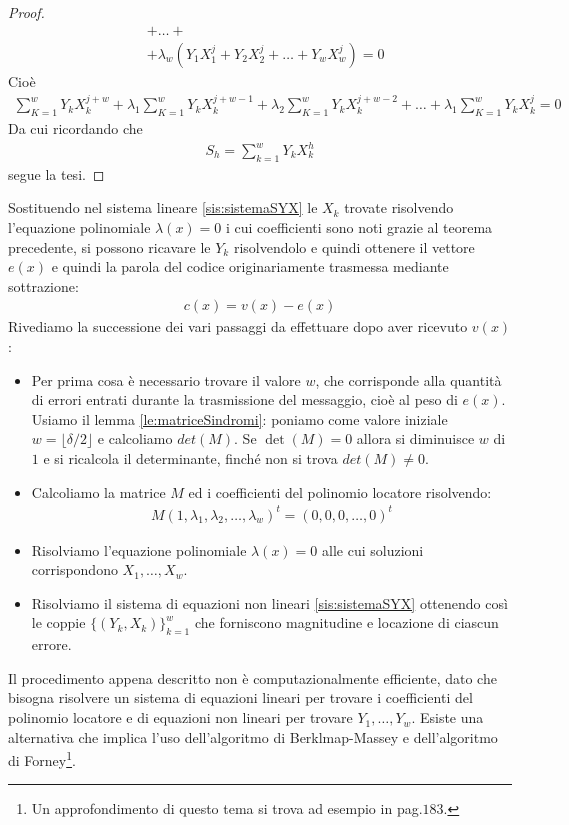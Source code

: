\begin{proof}
\begin{align*}
      &+ \dots + \\
      &+\lambda_{w}(Y_{1}X_{1}^{j} + Y_{2}X_{2}^{j} + \dots + Y_{w}X_{w}^{j}) = 0
   \end{align*}
   Cioè
   \begin{align*}
      \sum_{K=1}^{w} Y_{k}X_{k}^{j+w} + \lambda_{1}\sum_{K=1}^{w} Y_{k}X_{k}^{j+w-1} + \lambda_{2}\sum_{K=1}^{w} Y_{k}X_{k}^{j+w-2} + \dots + \lambda_{1}\sum_{K=1}^{w} Y_{k}X_{k}^{j} = 0
   \end{align*}
   Da cui ricordando che
   \begin{align*}
      S_{h} = \sum_{k=1}^{w} Y_{k}X_{k}^{h}
   \end{align*}
   segue la tesi.
\end{proof}

Sostituendo nel sistema lineare \ref{sis:sistemaSYX} le $X_{k}$ trovate risolvendo l'equazione polinomiale $\lambda(x)=0$ i cui coefficienti sono noti grazie al teorema precedente, si possono ricavare le $Y_{k}$ risolvendolo e quindi ottenere il vettore $e(x)$ e quindi la parola del codice originariamente trasmessa mediante sottrazione:
\begin{align*}
   c(x) = v(x) - e(x)
\end{align*}
Rivediamo la successione dei vari passaggi da effettuare dopo aver ricevuto $v(x)$:
\begin{itemize}
   \item Per prima cosa è necessario trovare il valore $w$, che corrisponde alla quantità di errori entrati durante la trasmissione del messaggio, cioè al peso di $e(x)$. Usiamo il lemma \ref{le:matriceSindromi}: poniamo come valore iniziale $w=\lfloor \delta/2 \rfloor$ e calcoliamo $det(M)$. Se $\det(M) = 0$ allora si diminuisce $w$ di $1$ e si ricalcola il determinante, finché non si trova $det(M) \neq 0$.
   \item Calcoliamo la matrice $M$ ed i coefficienti del polinomio locatore risolvendo:
   \begin{align*}
      M (1,\lambda_1, \lambda_{2}, \dots, \lambda_{w})^{t} = (0,0,0, \dots , 0)^{t}
   \end{align*}
   \item Risolviamo l'equazione polinomiale $\lambda(x) = 0$ alle cui soluzioni corrispondono $X_{1}, \dots , X_{w}$.
   \item Risolviamo il sistema di equazioni non lineari \ref{sis:sistemaSYX} ottenendo così le coppie $\lbrace (Y_{k},X_{k})\rbrace_{k=1}^{w}$ che forniscono magnitudine e locazione di ciascun errore.
\end{itemize}
Il procedimento appena descritto non è computazionalmente efficiente, dato che bisogna risolvere un sistema di equazioni lineari per trovare i coefficienti del polinomio locatore e di equazioni non lineari per trovare $Y_{1}, \dots , Y_{w}$. Esiste una alternativa che implica l'uso dell'algoritmo di Berklmap-Massey e dell'algoritmo di Forney\footnote{Un approfondimento di questo tema si trova ad esempio in \cite{blahut} pag.$183$.}.

